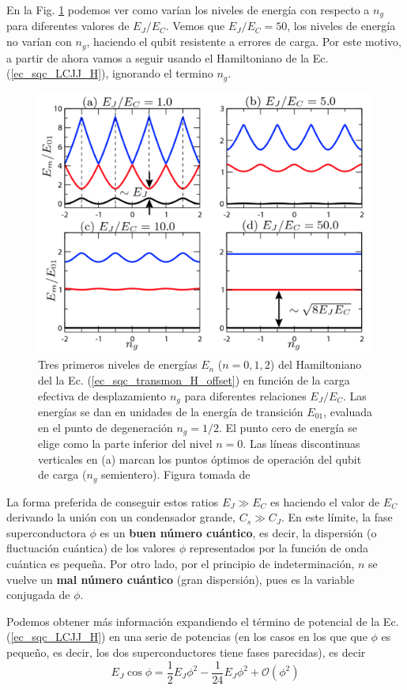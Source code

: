     En la Fig. \ref{Fig_sqc_transmon_offset_charge} podemos ver como varían los niveles de energía con respecto a $n_g$ para diferentes valores de $E_J/E_C$. Vemos que $E_J/E_C=50$, los niveles de energía no varían con $n_g$, haciendo el qubit resistente a errores de carga. Por este motivo, a partir de ahora vamos a seguir usando el Hamiltoniano de la Ec. (\ref{ec_sqc_LCJJ_H}), ignorando el termino $n_g$.

    \begin{figure}[h]
        \centering 
        \includegraphics[width=0.6\linewidth]{Figuras/Fig_sqc_transmon_offset_charge.png}
        \caption{Tres primeros niveles de energías $E_n$ ($n = 0, 1, 2$) del Hamiltoniano del la Ec. (\ref{ec_sqc_transmon_H_offset}) en función de la carga efectiva de desplazamiento $n_g$ para diferentes relaciones $E_J/E_C$. Las energías se dan en unidades de la energía de transición $E_{01}$, evaluada en el punto de degeneración $n_g = 1/2$. El punto cero de energía se elige como la parte inferior del nivel $n = 0$. Las líneas discontinuas verticales en (a) marcan los puntos óptimos de operación del qubit de carga ($n_g$ semientero). Figura tomada de  \cite{bib_transmon_first_paper}}
        \label{Fig_sqc_transmon_offset_charge}
    \end{figure}

    La forma preferida de conseguir estos ratios $E_J \gg E_C$ es haciendo el valor de $E_C$ derivando la unión con un condensador grande, $C_s \gg C_J$. En este límite, la fase superconductora $\phi$ es un \textbf{buen número cuántico}, es decir, la dispersión (o fluctuación cuántica) de los valores $\phi$ representados por la función de onda cuántica es pequeña. Por otro lado, por el principio de indeterminación,  $n$ se vuelve un \textbf{mal número cuántico} (gran dispersión), pues es la variable conjugada de $\phi$.
    
    Podemos obtener más información expandiendo el término de potencial de la Ec. (\ref{ec_sqc_LCJJ_H}) en una serie de potencias (en los casos en los que que $\phi$ es pequeño, es decir, los dos superconductores tiene fases parecidas), es decir
    \begin{equation} \label{ec_scq_transmon_potencial_taylor}
        E_J \cos \phi = \frac{1}{2} E_J \phi^2 - \frac{1}{24} E_J \phi^2 + \mathcal{O} (\phi^2)
    \end{equation}

